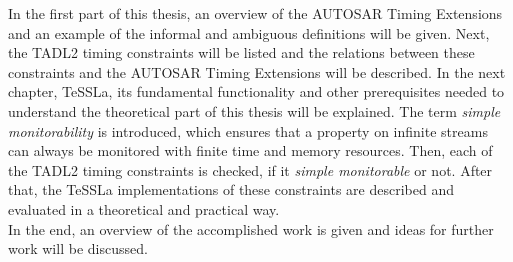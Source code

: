 	In the first part of this thesis, an overview of the AUTOSAR Timing Extensions and an example of the informal and ambiguous definitions  will be given. Next, the TADL2 timing constraints will be listed and the relations between these constraints and the AUTOSAR Timing Extensions will be described.
	In the next chapter, TeSSLa, its fundamental functionality and other prerequisites needed to understand the theoretical part of this thesis will be explained.
	The term \emph{simple monitorability} is introduced, which ensures that a property on infinite streams can always be monitored with finite time and memory resources.
	Then, each of the TADL2 timing constraints is checked, if it \textit{simple monitorable} or not. After that, the TeSSLa implementations of these constraints are described and evaluated in a theoretical and practical way.\\
	In the end, an overview of the accomplished work is given and ideas for further work will be discussed.